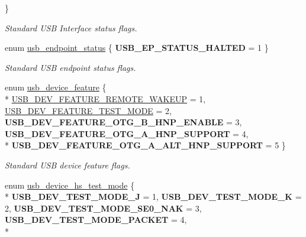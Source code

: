 \begin{DoxyCompactItemize}
 \}
\begin{DoxyCompactList}\small\item\em Standard U\-S\-B Interface status flags. \end{DoxyCompactList}\item 
enum \hyperlink{group__usb__protocol__group_gaf926ff975fcda57f214001b51f15092d}{usb\-\_\-endpoint\-\_\-status} \{ {\bfseries U\-S\-B\-\_\-\-E\-P\-\_\-\-S\-T\-A\-T\-U\-S\-\_\-\-H\-A\-L\-T\-E\-D} =  1
 \}
\begin{DoxyCompactList}\small\item\em Standard U\-S\-B endpoint status flags. \end{DoxyCompactList}\item 
enum \hyperlink{group__usb__protocol__group_gab9975b89ad7079085d0300eab037c3ac}{usb\-\_\-device\-\_\-feature} \{ \\*
\hyperlink{group__usb__protocol__group_ggab9975b89ad7079085d0300eab037c3aca9d1f5e6a07463ac38743db611c2c414a}{U\-S\-B\-\_\-\-D\-E\-V\-\_\-\-F\-E\-A\-T\-U\-R\-E\-\_\-\-R\-E\-M\-O\-T\-E\-\_\-\-W\-A\-K\-E\-U\-P} =  1, 
\hyperlink{group__usb__protocol__group_ggab9975b89ad7079085d0300eab037c3aca6724ffaefab5a3c54b199c4d1ea7b6ff}{U\-S\-B\-\_\-\-D\-E\-V\-\_\-\-F\-E\-A\-T\-U\-R\-E\-\_\-\-T\-E\-S\-T\-\_\-\-M\-O\-D\-E} =  2, 
{\bfseries U\-S\-B\-\_\-\-D\-E\-V\-\_\-\-F\-E\-A\-T\-U\-R\-E\-\_\-\-O\-T\-G\-\_\-\-B\-\_\-\-H\-N\-P\-\_\-\-E\-N\-A\-B\-L\-E} =  3, 
{\bfseries U\-S\-B\-\_\-\-D\-E\-V\-\_\-\-F\-E\-A\-T\-U\-R\-E\-\_\-\-O\-T\-G\-\_\-\-A\-\_\-\-H\-N\-P\-\_\-\-S\-U\-P\-P\-O\-R\-T} =  4, 
\\*
{\bfseries U\-S\-B\-\_\-\-D\-E\-V\-\_\-\-F\-E\-A\-T\-U\-R\-E\-\_\-\-O\-T\-G\-\_\-\-A\-\_\-\-A\-L\-T\-\_\-\-H\-N\-P\-\_\-\-S\-U\-P\-P\-O\-R\-T} =  5
 \}
\begin{DoxyCompactList}\small\item\em Standard U\-S\-B device feature flags. \end{DoxyCompactList}\item 
enum \hyperlink{group__usb__protocol__group_ga9027bb283d3666e351fe5c403292cf2e}{usb\-\_\-device\-\_\-hs\-\_\-test\-\_\-mode} \{ \\*
{\bfseries U\-S\-B\-\_\-\-D\-E\-V\-\_\-\-T\-E\-S\-T\-\_\-\-M\-O\-D\-E\-\_\-\-J} =  1, 
{\bfseries U\-S\-B\-\_\-\-D\-E\-V\-\_\-\-T\-E\-S\-T\-\_\-\-M\-O\-D\-E\-\_\-\-K} =  2, 
{\bfseries U\-S\-B\-\_\-\-D\-E\-V\-\_\-\-T\-E\-S\-T\-\_\-\-M\-O\-D\-E\-\_\-\-S\-E0\-\_\-\-N\-A\-K} =  3, 
{\bfseries U\-S\-B\-\_\-\-D\-E\-V\-\_\-\-T\-E\-S\-T\-\_\-\-M\-O\-D\-E\-\_\-\-P\-A\-C\-K\-E\-T} =  4, 
\\*

\end{DoxyCompactItemize}
